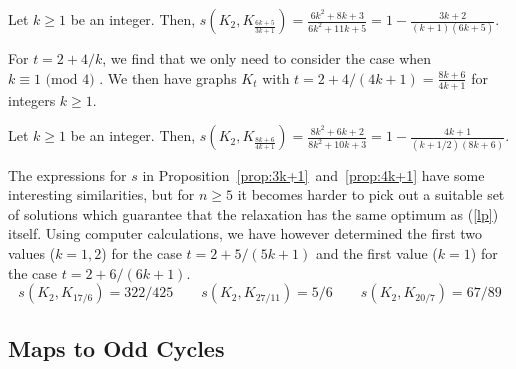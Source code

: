 \documentclass[11pt,a4paper]{article}
\begin{document}
\begin{proposition} \label{prop:3k+1}
Let $k \geq 1$ be an integer. Then, $s(K_2,K_{\frac{6k+5}{3k+1}})=\frac{6k^2+8k+3}{6k^2+11k+5}=1 - \frac{3k+2}{(k+1)(6k+5)}$.
\end{proposition}








For $t = 2 + 4/k$, we find that we only need to consider the case when $k \equiv 1 \mbox{ (mod 4) }$.
We then have graphs $K_{t}$ with $t = 2+4/(4k+1) = \frac{8k+6}{4k+1}$ for integers $k \geq 1$.




\begin{proposition} \label{prop:4k+1}
Let $k \geq 1$ be an integer. Then, $s(K_2,K_{\frac{8k+6}{4k+1}})=\frac{8k^2+6k+2}{8k^2+10k+3}=1 - \frac{4k+1}{(k+1/2)(8k+6)}$.
\end{proposition}




The expressions for $s$ in Proposition~\ref{prop:3k+1}~and~\ref{prop:4k+1}
have some interesting similarities, but for $n \geq 5$ it becomes harder to
pick out a suitable set of solutions which guarantee that the relaxation has
the same optimum as (\ref{lp}) itself.
Using computer calculations, we have however determined the first
two values ($k = 1, 2$) for the case $t = 2+5/(5k+1)$
and the first value ($k = 1$) for the case $t = 2+6/(6k+1)$.
\begin{equation}
  s(K_2, K_{17/6})  = 322/425 \qquad 
  s(K_2, K_{27/11}) = 5/6 \qquad 
  s(K_2, K_{20/7})  = 67/89
\end{equation}

\subsection{Maps to Odd Cycles} \label{ssec:odd}
\end{document}
